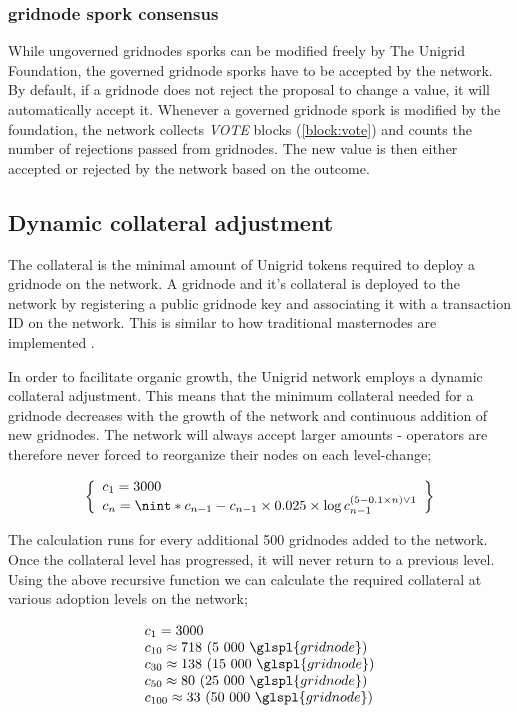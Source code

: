 \documentclass[10pt,a4paper,final]{article}
\DeclarePairedDelimiter{\nint}\lfloor\rceil
\begin{document}
\subsubsection{\Gls{gridnode} spork consensus}
While ungoverned \glspl{gridnode} sporks can be modified freely by The Unigrid Foundation, the governed \gls{gridnode} sporks have to be accepted by the network. By default, if a \gls{gridnode} does not reject the proposal to change a value, it will automatically accept it. Whenever a governed \gls{gridnode} spork is modified by the foundation, the network collects \emph{VOTE} blocks (\ref{block:vote}) and counts the number of rejections passed from gridnodes. The new value is then either accepted or rejected by the network based on the outcome.

\subsection{Dynamic collateral adjustment}
\label{section:dyncol}
The collateral is the minimal amount of Unigrid tokens required to deploy a \gls{gridnode} on the network. A \gls{gridnode} and it's collateral is deployed to the network by registering a public \gls{gridnode} key and associating it with a transaction ID on the network. This is similar to how traditional masternodes are implemented \cite{darkcoin2014}.

In order to facilitate organic growth, the Unigrid network employs a dynamic collateral adjustment. This means that the minimum collateral needed for a \gls{gridnode} decreases with the growth of the network and continuous addition of new \glspl{gridnode}. The network will always accept larger amounts - operators are therefore never forced to reorganize their nodes on each level-change;

\[
	\left\{
		\begin{array}{l}
		c_1 = 3000\\
		c_n = \nint*{ c_{n - 1} - c_{n - 1} \times 0.025 \times \log c_{n - 1}^{(5 - 0.1  \times n) \vee 1} }\\
		\end{array}
	\right\}
\]

\noindent The calculation runs for every additional 500 \glspl{gridnode} added to the network. Once the collateral level has progressed, it will never return to a previous level. Using the above recursive function we can calculate the required collateral at various adoption levels on the network;

\[
	\begin{array}{l}
	c_1 = 3000\\
	c_{10} \approx 718\ (5\ 000\ \glspl{gridnode})\\
	c_{30} \approx 138\ (15\ 000\ \glspl{gridnode})\\
	c_{50} \approx 80\ (25\ 000\ \glspl{gridnode})\\
	c_{100} \approx 33\ (50\ 000\ \glspl{gridnode})
	\end{array}
\]
\end{document}
